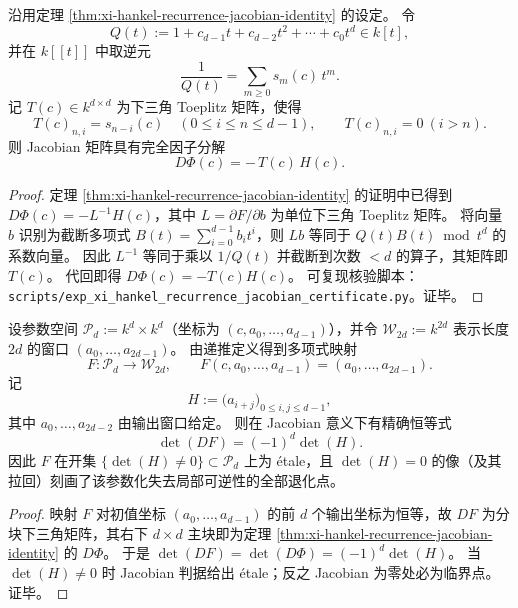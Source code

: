 \begin{proposition}\label{prop:xi-hankel-jacobian-toeplitz-hankel-factorization}
沿用定理 \ref{thm:xi-hankel-recurrence-jacobian-identity} 的设定。
令
\[
Q(t):=1+c_{d-1}t+c_{d-2}t^2+\cdots+c_0t^d\in k[t],
\]
并在 \(k[[t]]\) 中取逆元
\[
\frac{1}{Q(t)}=\sum_{m\ge 0}s_m(c)\,t^m.
\]
记 \(T(c)\in k^{d\times d}\) 为下三角 Toeplitz 矩阵，使得
\[
T(c)_{n,i}=s_{n-i}(c)\quad(0\le i\le n\le d-1),\qquad T(c)_{n,i}=0\ (i>n).
\]
则 Jacobian 矩阵具有完全因子分解
\[
D\Phi(c)=-\,T(c)\,H(c).
\]
\end{proposition}
\begin{proof}
定理 \ref{thm:xi-hankel-recurrence-jacobian-identity} 的证明中已得到 \(D\Phi(c)=-L^{-1}H(c)\)，其中 \(L=\partial F/\partial b\) 为单位下三角 Toeplitz 矩阵。
将向量 \(b\) 识别为截断多项式 \(B(t)=\sum_{i=0}^{d-1}b_it^i\)，则 \(Lb\) 等同于 \(Q(t)B(t)\bmod t^d\) 的系数向量。
因此 \(L^{-1}\) 等同于乘以 \(1/Q(t)\) 并截断到次数 \(<d\) 的算子，其矩阵即 \(T(c)\)。
代回即得 \(D\Phi(c)=-T(c)H(c)\)。
可复现核验脚本：\texttt{scripts/exp\_xi\_hankel\_recurrence\_jacobian\_certificate.py}。证毕。
\end{proof}

\begin{corollary}\label{cor:xi-hankel-discriminant-divisor-parameterization-critical-locus}
设参数空间 \(\mathcal P_d:=k^d\times k^d\)（坐标为 \((c,a_0,\dots,a_{d-1})\)），并令 \(\mathcal W_{2d}:=k^{2d}\) 表示长度 \(2d\) 的窗口 \((a_0,\dots,a_{2d-1})\)。
由递推定义得到多项式映射
\[
F:\mathcal P_d\to \mathcal W_{2d},\qquad F(c,a_0,\dots,a_{d-1})=(a_0,\dots,a_{2d-1}).
\]
记
\[
H:=\bigl(a_{i+j}\bigr)_{0\le i,j\le d-1},
\]
其中 \(a_0,\dots,a_{2d-2}\) 由输出窗口给定。
则在 Jacobian 意义下有精确恒等式
\[
\det(DF)=(-1)^d\det(H).
\]
因此 \(F\) 在开集 \(\{\det(H)\neq 0\}\subset\mathcal P_d\) 上为 \'etale，且 \(\det(H)=0\) 的像（及其拉回）刻画了该参数化失去局部可逆性的全部退化点。
\end{corollary}
\begin{proof}
映射 \(F\) 对初值坐标 \((a_0,\dots,a_{d-1})\) 的前 \(d\) 个输出坐标为恒等，故 \(DF\) 为分块下三角矩阵，其右下 \(d\times d\) 主块即为定理 \ref{thm:xi-hankel-recurrence-jacobian-identity} 的 \(D\Phi\)。
于是 \(\det(DF)=\det(D\Phi)=(-1)^d\det(H)\)。
当 \(\det(H)\neq 0\) 时 Jacobian 判据给出 \'etale；反之 Jacobian 为零处必为临界点。证毕。
\end{proof}

